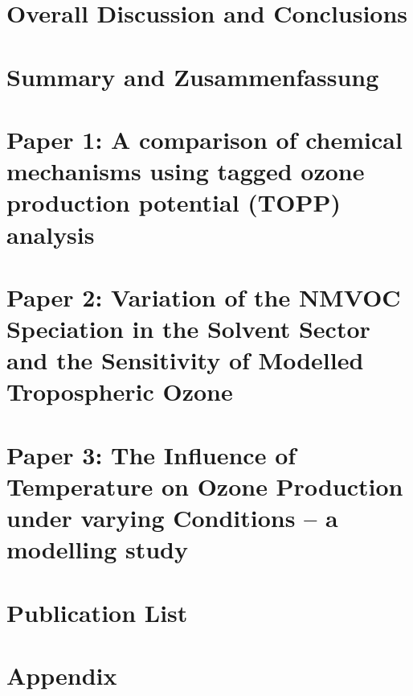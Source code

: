 \documentclass[12pt,twoside,openright,a4paper]{report}
\begin{document}
\chapter{Overall Discussion and Conclusions} \label{c:conclusions}
\clearpage{\pagestyle{empty}\cleardoublepage}

\chapter{Summary and Zusammenfassung} \label{c:summary}
\clearpage{\pagestyle{empty}\cleardoublepage}


 
\clearpage{\pagestyle{empty}\cleardoublepage}

\chapter{Paper 1: A comparison of chemical mechanisms using tagged ozone production potential (TOPP) analysis} \label{c:paper_1}
\clearpage{\pagestyle{empty}\cleardoublepage}



\chapter{Paper 2: Variation of the NMVOC Speciation in the Solvent Sector and the Sensitivity of Modelled Tropospheric Ozone} \label{c:paper_2}
\clearpage{\pagestyle{empty}\cleardoublepage}

\chapter{Paper 3: The Influence of Temperature on Ozone Production under varying  Conditions -- a modelling study} \label{c:paper_3}
\clearpage{\pagestyle{empty}\cleardoublepage}

\chapter{Publication List}
\clearpage{\pagestyle{empty}\cleardoublepage}

\chapter*{Appendix}
\clearpage{\pagestyle{empty}\cleardoublepage}
\end{document}
